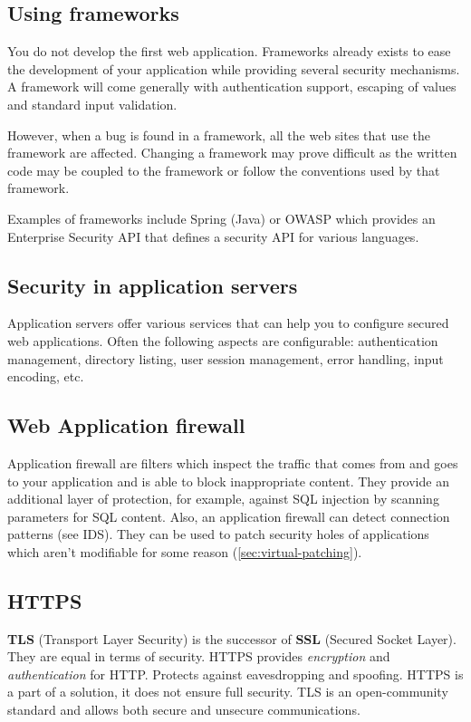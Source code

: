 \subsection{Using frameworks}

You do not develop the first web application. Frameworks already exists to
ease the development of your application while providing several security
mechanisms.
A framework will come generally with authentication support, escaping of
values and standard input validation.

However, when a bug is found in a framework, all the web sites that use the
framework are affected. Changing a framework may prove difficult as the
written code may be coupled to the framework or follow the conventions used by
that framework.

Examples of frameworks include Spring (Java) or OWASP which provides an Enterprise
Security API that defines a security API for various languages.

\subsection{Security in application servers}

Application servers offer various services that can help you to configure
secured web applications.
Often the following aspects are configurable: authentication management,
directory listing, user session management, error handling, input encoding,
etc.

\subsection{Web Application firewall}

Application firewall are filters which inspect the traffic that comes
from and goes to your application and is able to block inappropriate
content.
They provide an additional layer of protection, for example, against
SQL injection by scanning parameters for SQL content.
Also, an application firewall can detect connection patterns (see IDS).
They can be used to patch security holes of applications which aren't
modifiable for some reason (\autoref{sec:virtual-patching}).

\subsection{HTTPS}

\textbf{TLS} (Transport Layer Security) is the successor of \textbf{SSL}
(Secured Socket Layer).
They are equal in terms of security.
HTTPS provides \emph{encryption} and \emph{authentication} for HTTP.
\newline Protects against eavesdropping and spoofing.
HTTPS is a part of a solution, it does not ensure full security.
TLS is an open-community standard and allows both secure and unsecure
communications.

